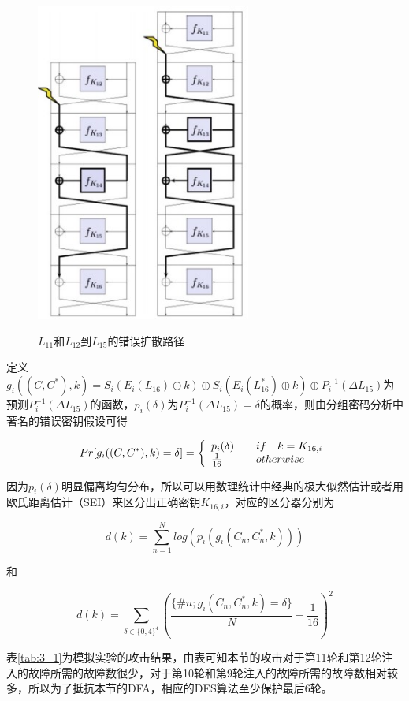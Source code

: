 \documentclass[a4paper,12pt]{article}
\begin{document}
\begin{CJK}{UTF8}{gkai}
\begin{figure}
\centering
\caption{$L_{11}$和$L_{12}$到$L_{15}$的错误扩散路径}
\includegraphics[width=200pt]{des_error_propagation.jpg}
\label{des_error_propagation}
\end{figure}

定义$g_i((C,C^*),k)=S_i(E_i(L_{16}) \oplus k) \oplus S_i(E_i(L_{16}^*) \oplus k) \oplus P_i^{-1}(\Delta L_{15})$为预测$P_i^{-1}(\Delta L_{15})$的函数，$p_i(\delta)$为$P_i^{-1}(\Delta L_{15}) = \delta$的概率，则由分组密码分析中著名的错误密钥假设可得

\[
  Pr[g_i((C, C^*), k) = \delta] = \left\{ 
  \begin{array}{l l}
    p_i(\delta) & \quad if \quad k = K_{16,i} \\
    \frac{1}{16} & \quad otherwise \\
  \end{array} \right.
\]

因为$p_i(\delta)$明显偏离均匀分布，所以可以用数理统计中经典的极大似然估计或者用欧氏距离估计（SEI）来区分出正确密钥$K_{16,i}$，对应的区分器分别为

\[
d(k)=\sum_{n=1}^{N}log(p_i(g_i(C_n,C_n^*, k)))
\]

和

\[
d(k) = \sum_{\delta \in \{0,4\}^4}( \frac{\{\#n;g_i(C_n,C_n^*,k) = \delta\}}{N} - \frac{1}{16})^2
\]

表\ref{tab:3_1}为模拟实验的攻击结果，由表可知本节的攻击对于第11轮和第12轮注入的故障所需的故障数很少，对于第10轮和第9轮注入的故障所需的故障数相对较多，所以为了抵抗本节的DFA，相应的DES算法至少保护最后6轮。


\end{CJK}
\end{document}
